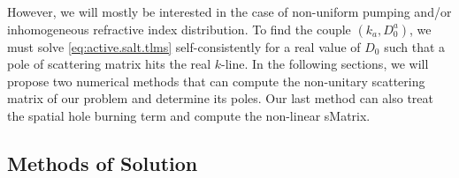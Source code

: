However, we will mostly be interested in the case of non-uniform pumping
and/or inhomogeneous refractive index distribution. To find the couple
$(k_a,D_0^a)$, we must solve \eqref{eq:active.salt.tlms} self-consistently
for a real value of $D_0$ such that a pole of scattering matrix hits 
the real $k$-line. In the following sections, we will propose two
numerical methods that can compute the non-unitary scattering matrix
of our problem and determine its poles. Our last method can also 
treat the spatial hole burning term and compute the non-linear 
\gls{sMatrix}.

\subsection{Methods of Solution}
%
%
